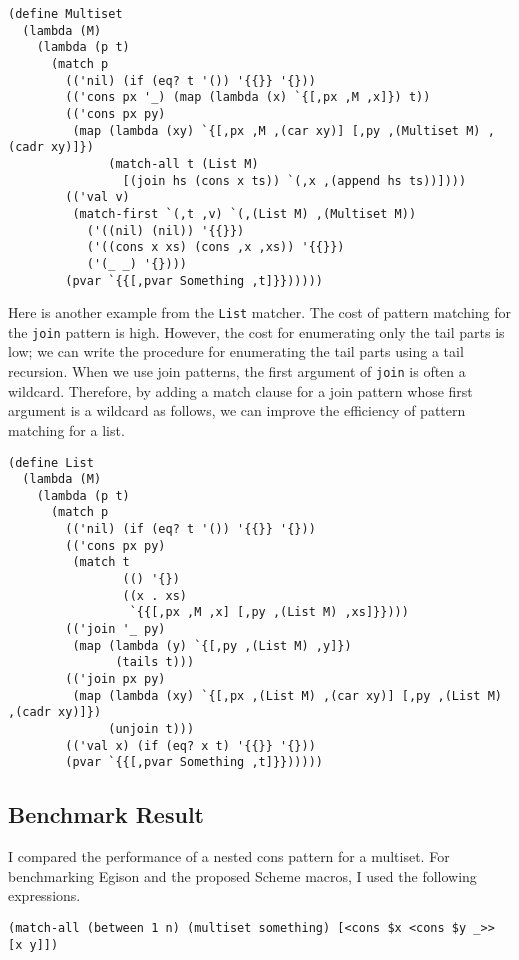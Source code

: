 \documentclass[acmlarge]{acmart}
\begin{document}
\begin{lstlisting}[language=egison]
(define Multiset
  (lambda (M)
    (lambda (p t)
      (match p
        (('nil) (if (eq? t '()) '{{}} '{}))
        (('cons px '_) (map (lambda (x) `{[,px ,M ,x]}) t))
        (('cons px py)
         (map (lambda (xy) `{[,px ,M ,(car xy)] [,py ,(Multiset M) ,(cadr xy)]})
              (match-all t (List M)
                [(join hs (cons x ts)) `(,x ,(append hs ts))])))
        (('val v)
         (match-first `(,t ,v) `(,(List M) ,(Multiset M))
           ('((nil) (nil)) '{{}})
           ('((cons x xs) (cons ,x ,xs)) '{{}})
           ('(_ _) '{})))
        (pvar `{{[,pvar Something ,t]}})))))
\end{lstlisting}

Here is another example from the \texttt{List} matcher.
The cost of pattern matching for the \texttt{join} pattern is high.
However, the cost for enumerating only the tail parts is low; we can write the procedure for enumerating the tail parts using a tail recursion.
When we use join patterns, the first argument of \texttt{join} is often a wildcard.
Therefore, by adding a match clause for a join pattern whose first argument is a wildcard as follows, we can improve the efficiency of pattern matching for a list.

\begin{lstlisting}[language=egison]
(define List
  (lambda (M)
    (lambda (p t)
      (match p
        (('nil) (if (eq? t '()) '{{}} '{}))
        (('cons px py)
         (match t
                (() '{})
                ((x . xs)
                 `{{[,px ,M ,x] [,py ,(List M) ,xs]}})))
        (('join '_ py)
         (map (lambda (y) `{[,py ,(List M) ,y]})
               (tails t)))
        (('join px py)
         (map (lambda (xy) `{[,px ,(List M) ,(car xy)] [,py ,(List M) ,(cadr xy)]})
              (unjoin t)))
        (('val x) (if (eq? x t) '{{}} '{}))
        (pvar `{{[,pvar Something ,t]}})))))
\end{lstlisting}

\subsection{Benchmark Result}

I compared the performance of a nested cons pattern for a multiset.
For benchmarking Egison and the proposed Scheme macros, I used the following expressions.

\begin{lstlisting}[language=egison]
(match-all (between 1 n) (multiset something) [<cons $x <cons $y _>> [x y]])
\end{lstlisting}
\end{document}
